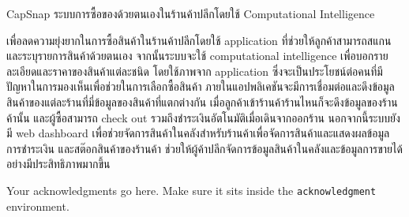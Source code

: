 \maketitle
\makesignature

\ifproject
\begin{abstractTH}
CapSnap  ระบบการซื้อของด้วยตนเองในร้านค้าปลีกโดยใช้ Computational Intelligence

\enskip เพื่อลดความยุ่งยากในการซื้อสินค้าในร้านค้าปลีกโดยใช้ application ที่ช่วยให้ลูกค้าสามารถสแกนและระบุรายการสินค้าด้วยตนเอง  
จากนั้นระบบจะใช้ computational intelligence  
เพื่อบอกรายละเอียดและราคาของสินค้าแต่ละชนิด โดยใช้ภาพจาก application
ซึ่งจะเป็นประโยชน์ต่อคนที่มีปัญหาในการมองเห็นเพื่อช่วยในการเลือกซื้อสินค้า  
\enskip ภายในแอปพลิเคชันจะมีการเชื่อมต่อและดึงข้อมูลสินค้าของแต่ละร้านที่มี่ข้อมูลของสินค้าที่แตกต่างกัน  
เมื่อลูกค้าเข้าร้านค้าร้านไหนก็จะดึงข้อมูลของร้านค้านั้น และผู้ซื้อสามารถ check out รวมถึงชําระเงินอัตโนมัติเมื่อเดินจากออกร้าน 
\enskip นอกจากนี้ระบบยังมี web dashboard เพื่อช่วยจัดการสินค้าในคลังสําหรับร้านค้าเพื่อจัดการสินค้าและแสดงผลข้อมูลการชําระเงิน 
และสต๊อกสินค้าของร้านค้า ช่วยให้ผู้ค้าปลีกจัดการข้อมูลสินค้าในคลังและข้อมูลการขายได้อย่างมีประสิทธิภาพมากขึ้น
    
\end{abstractTH}



\iffalse
\begin{dedication}
This document is dedicated to all Chiang Mai University students.

Dedication page is optional.
\end{dedication}
\fi %

\begin{acknowledgments}
Your acknowledgments go here. Make sure it sits inside the
\texttt{acknowledgment} environment.

\end{acknowledgments}%
\fi %

\contentspage

\ifproject
\figurelistpage

\tablelistpage
\fi %



